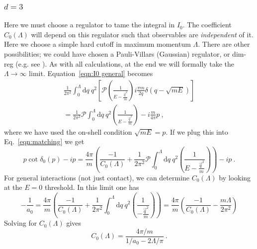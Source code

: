 \documentclass[11pt]{article}
\begin{document}
\subsubsection{$d=3$}
Here we must choose a regulator to tame the integral in $I_0$.  The coefficient $C_0(\Lambda)$ will depend on this regulator such that observables are \emph{independent} of it.  Here we choose a simple hard cutoff in maximum momentum $\Lambda$.  There are other possibilities;  we could have chosen a Pauli-Villars (Gaussian) regulator, or dim-reg (e.g. see \cite{Kaplan:1998we}).  As with all calculations, at the end we will formally take the $\Lambda\to\infty$ limit.  Equation~\eqref{eqn:I0 general} becomes
\begin{multline}
\frac{1}{2\pi^2}\int_0^\Lambda  \mathrm { d } q \ q^2\left[\mathcal{P} \left( \frac { 1 } { E - \frac{\vec{q}^2}{m} } \right)
i\frac{\pi m}{2q}\delta(q-\sqrt{mE})\right]\\
=\frac{1}{2\pi^2}\mathcal{P}\int_0^\Lambda  \mathrm { d } q \ q^2 \left( \frac { 1 } { E - \frac{\vec{q}^2}{m} } \right)
-i\frac{m}{4\pi}p\ ,
\end{multline}
where we have used the on-shell condition $\sqrt{mE}=p$.  If we plug this into Eq.~\eqref{eqn:matching} we get
\begin{equation}\label{eqn:matching 2}
p\cot \delta_0(p)-ip=\frac{4\pi}{m}\left(\frac{-1}{C_0(\Lambda)}+\frac{1}{2\pi^2}\mathcal{P}\int_0^\Lambda  \mathrm { d } q \ q^2 \left( \frac { 1 } { E - \frac{\vec{q}^2}{m} } \right)\right)-ip\ .
\end{equation}
For general interactions (not just contact), we can determine $C_0(\Lambda)$ by looking at the $E=0$ threshold.  In this limit one has
\begin{equation}\label{eqn:matching 3}
-\frac{1}{a_0}=\frac{4\pi}{m}\left(\frac{-1}{C_0(\Lambda)}+\frac{1}{2\pi^2}\int_0^\Lambda  \mathrm { d } q \ q^2 \left( \frac { 1 } {  - \frac{\vec{q}^2}{m} } \right)\right)
=\frac{4\pi}{m}\left(\frac{-1}{C_0(\Lambda)}-\frac{m\Lambda}{2\pi^2}\right)
\end{equation}
Solving for $C_0(\Lambda)$ gives
\begin{equation}\label{eqn:C 3}
C_0(\Lambda)=\frac{4\pi/m}{1/a_0-2\Lambda/\pi}\ .
\end{equation}
\end{document}
